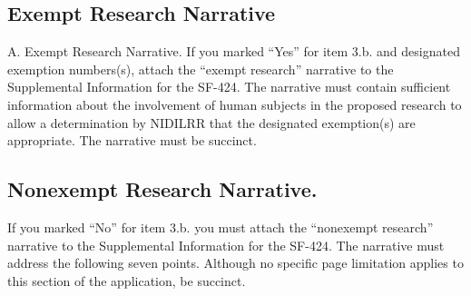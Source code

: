 \subsection{Exempt Research Narrative}

A. Exempt Research Narrative.
If you marked “Yes” for item 3.b. and designated exemption numbers(s), attach the “exempt research” narrative to the Supplemental Information for the SF-424. The narrative must contain sufficient information about the involvement of human subjects in the proposed research to allow a determination by NIDILRR that the designated exemption(s) are appropriate. The narrative must be succinct.
\subsection{ Nonexempt Research Narrative.}
If you marked “No” for item 3.b. you must attach the “nonexempt research” narrative to the
Supplemental Information for the SF-424. The narrative must address the following seven points. Although no specific page limitation applies to this section of the application, be succinct.
